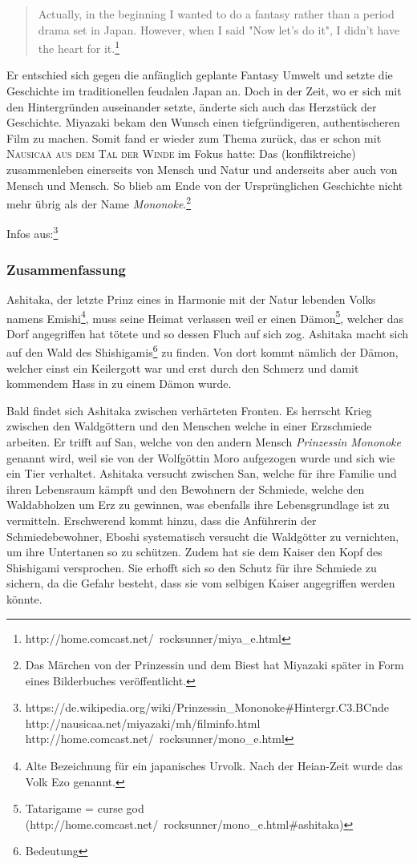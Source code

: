 \begin{quote} Actually, in the beginning I wanted to do a fantasy rather than a period drama set in Japan. However, when I said "Now let's do it", I didn't have the heart for it.\footnote{http://home.comcast.net/~rocksunner/miya\_e.html} 
\end{quote}

Er entschied sich gegen die anfänglich geplante Fantasy Umwelt und setzte die Geschichte im traditionellen feudalen Japan an. Doch in der Zeit, wo er sich mit den Hintergründen auseinander setzte, änderte sich auch das Herzstück der Geschichte. Miyazaki bekam den Wunsch einen tiefgründigeren, authentischeren Film zu machen. Somit fand er wieder zum Thema zurück, das er schon mit \textsc{Nausicaä aus dem Tal der Winde} im Fokus hatte: Das (konfliktreiche) zusammenleben einerseits von Mensch und Natur und anderseits aber auch von Mensch und Mensch. So blieb am Ende von der Ursprünglichen Geschichte nicht mehr übrig als der Name \emph{Mononoke}.\footnote{Das Märchen von der Prinzessin und dem Biest hat Miyazaki später in Form eines Bilderbuches veröffentlicht.} 

Infos aus:\footnote{https://de.wikipedia.org/wiki/Prinzessin\_Mononoke\#Hintergr.C3.BCnde http://nausicaa.net/miyazaki/mh/filminfo.html http://home.comcast.net/~rocksunner/mono\_e.html}
\subsubsection{Zusammenfassung}
Ashitaka, der letzte Prinz eines in Harmonie mit der Natur lebenden Volks namens Emishi\footnote{Alte Bezeichnung für ein japanisches Urvolk. Nach der Heian-Zeit wurde das Volk Ezo genannt.}, muss seine Heimat verlassen weil er einen Dämon\footnote{Tatarigame = curse god (http://home.comcast.net/~rocksunner/mono\_e.html\#ashitaka)}, welcher das Dorf angegriffen hat tötete und so dessen Fluch auf sich zog. Ashitaka macht sich auf den Wald des Shishigamis\footnote{Bedeutung} zu finden. Von dort kommt nämlich der Dämon, welcher einst ein Keilergott war und erst durch den Schmerz und damit kommendem Hass in zu einem Dämon wurde. 

Bald findet sich Ashitaka zwischen verhärteten Fronten. Es herrscht Krieg zwischen den Waldgöttern und den Menschen welche in einer Erzschmiede arbeiten. Er trifft auf San, welche von den andern Mensch \emph{Prinzessin Mononoke} genannt wird, weil sie von der Wolfgöttin Moro aufgezogen wurde und sich wie ein Tier verhaltet. Ashitaka versucht zwischen San, welche für ihre Familie und ihren Lebensraum kämpft und den Bewohnern der Schmiede, welche den Waldabholzen um Erz zu gewinnen, was ebenfalls ihre Lebensgrundlage ist zu vermitteln. Erschwerend kommt hinzu, dass die Anführerin der Schmiedebewohner, Eboshi systematisch versucht die Waldgötter zu vernichten, um ihre Untertanen so zu schützen. Zudem hat sie dem Kaiser den Kopf des Shishigami versprochen. Sie erhofft sich so den Schutz für ihre Schmiede zu sichern, da die Gefahr besteht, dass sie vom selbigen Kaiser angegriffen werden könnte. 

